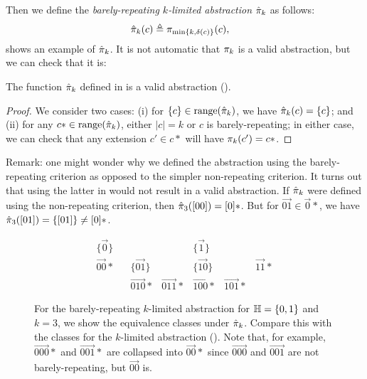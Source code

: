 Then we define the {\em barely-repeating $k$-limited abstraction} $\hat{\pi}_k$ as follows:
\begin{align}
\label{eqn:barelyAbstraction}
\hat{\pi}_k(c) & \triangleq \pi_{\min\{k,\delta(c)\}}(c),
\end{align}
 shows an example of $\hat{\pi}_k$.
It is not automatic that $\pi_k$ is a valid abstraction,
but we can check that it is:
\begin{proposition}
\label{prop:barelyAbstraction}
The function $\hat{\pi}_k$ defined in  is a valid abstraction
().
\end{proposition}
\begin{proof}
We consider two cases: (i) for $\{c\} \in \text{range}(\hat{\pi}_k)$,
we have $\hat{\pi}_k(c) = \{c\}$; and (ii) for any $c* \in \text{range}(\hat{\pi}_k)$,
either $|c| = k$ or $c$ is barely-repeating; in either case,
we can check that any extension $c' \in c*$ will have $\pi_k(c') = c*$.
\end{proof}
Remark: one might wonder why we defined the abstraction using the barely-repeating criterion
as opposed to the simpler non-repeating criterion.
It turns out that using the latter in  would not result in a valid abstraction.
If $\hat{\pi}_k$ were defined using the non-repeating criterion,
then $\hat{\pi}_3([00]) = [0]*$.
But for $\vec{01} \in \vec{0}*$, we have $\hat{\pi}_3([01]) = \{[01]\} \neq [0]*$.

\begin{figure}
\[
\begin{array}{lllllll}
\{\vec{0}\}    &            &              &            & \{\vec{1}\} \\
\vec{00}*      &            & \{\vec{01}\} &            & \{\vec{10}\} &            & \vec{11}* \\
               &            & \vec{010}*   & \vec{011}* & \vec{100}*   & \vec{101}* &
\end{array}
\]
\caption{\label{fig:barelyExample} For the barely-repeating $k$-limited abstraction
for ${\mathbb H} = \{0,1\}$ and $k = 3$, we show the equivalence classes under $\hat{\pi}_k$.
Compare this with the classes for the $k$-limited abstraction ().
Note that, for example,
$\vec{000}*$ and $\vec{001}*$ are collapsed into $\vec{00}*$ since $\vec{000}$ and $\vec{001}$ are not barely-repeating,
but $\vec{00}$ is.
}
\end{figure}

